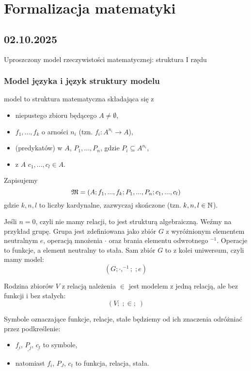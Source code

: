 \chapter{Formalizacja matematyki}

\section{02.10.2025}{Uproszczony model rzeczywistości matematycznej: struktura I rzędu}

\subsection{Model języka i język struktury modelu}

\begin{definition}{model}{}
   to struktura matematyczna składająca się z
  \begin{itemize}
    \item niepustego zbioru będącego  $A\neq \emptyset$,
    \item {} $f_1,..., f_k$ o arności $n_i$ (tzn. $f_i:A^{n_i}\to A$),
    \item {} (predykatów) w $A$, $P_1,..., P_n$, gdzie $P_i\subseteq A^{n_i}$,
    \item {} z $A$ $c_1,..., c_l\in A$.
  \end{itemize}
\end{definition}

Zapisujemy
$$\mathfrak{M}=(A; f_1,...,f_k; P_1,...,P_n; c_1,...,c_l)$$
gdzie $k,n,l$ to liczby kardynalne, zazwyczaj skończone (tzn. $k,n,l\in\mathbb{N}$).

\begin{example}[m]
\item Jeśli $n=0$, czyli nie mamy relacji, to \Mm{} jest strukturą algebraiczną. Weźmy na przykład grupę. Grupa jest zdefiniowana jako zbiór $G$ z wyróżnionym elementem neutralnym $e$, operacją mnożenia $\cdot$ oraz brania elementu odwrotnego $^{-1}$. Operacje to funkcje, a element neutralny to stała. Sam zbiór $G$ to z kolei uniwersum, czyli mamy model:
  $$(G; \cdot, ^{-1};\;;e)$$
\item Rodzina zbiorów $V$ z relacją należenia $\in$ jest modelem z jedną relacją, ale bez funkcji i bez stałych:
  $$(V;\;;\in;\;)$$
\end{example}

Symbole oznaczające funkcje, relacje, stałe będziemy od ich znaczenia odróżniać przez podkreślenie:
\begin{itemize}
  \item $\underline{f_i}$, $\underline{P_j}$, $\underline{c_t}$ to symbole, 
  \item natomiast $f_i$, $P_J$, $c_t$ to funkcja, relacja, stała.
\end{itemize}

